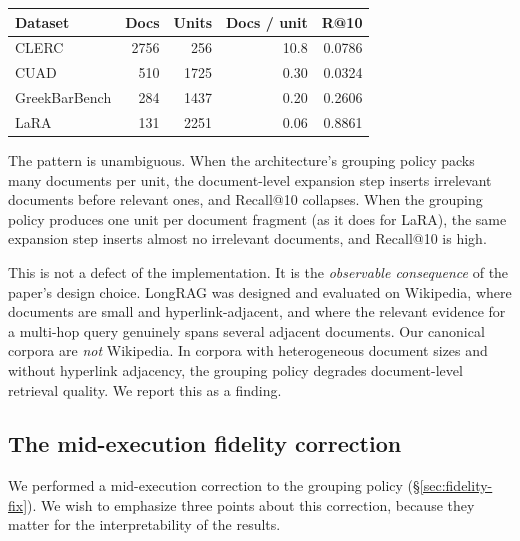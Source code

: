 \documentclass[11pt,a4paper]{article}
\begin{document}
\begin{center}
\small
\begin{tabular}{l r r r r}
\toprule
\textbf{Dataset} & \textbf{Docs} & \textbf{Units}
  & \textbf{Docs / unit} & \textbf{R@10} \\
\midrule
CLERC              & \num{2756} & \num{256}   & \num{10.8} & \num{0.0786} \\
CUAD               & \num{510}  & \num{1725}  & \num{0.30} & \num{0.0324} \\
GreekBarBench      & \num{284}  & \num{1437}  & \num{0.20} & \num{0.2606} \\
LaRA               & \num{131}  & \num{2251}  & \num{0.06} & \num{0.8861} \\
\bottomrule
\end{tabular}
\end{center}

The pattern is unambiguous. When the architecture's grouping policy
packs many documents per unit, the document-level expansion step
inserts irrelevant documents before relevant ones, and Recall@10
collapses. When the grouping policy produces one unit per document
fragment (as it does for LaRA), the same expansion step inserts
almost no irrelevant documents, and Recall@10 is high.

This is not a defect of the implementation. It is the
\emph{observable consequence} of the paper's design choice. LongRAG
was designed and evaluated on Wikipedia, where documents are small
and hyperlink-adjacent, and where the relevant evidence for a
multi-hop query genuinely spans several adjacent documents. Our
canonical corpora are \emph{not} Wikipedia. In corpora with
heterogeneous document sizes and without hyperlink adjacency, the
grouping policy degrades document-level retrieval quality. We
report this as a finding.

\subsection{The mid-execution fidelity correction}
We performed a mid-execution correction to the grouping policy
(\S\ref{sec:fidelity-fix}). We wish to emphasize three points about
this correction, because they matter for the interpretability of
the results.
\end{document}
